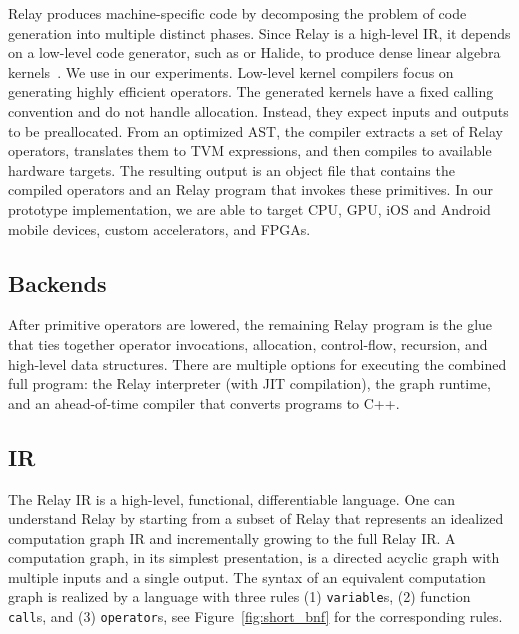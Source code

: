   Relay produces machine-specific code
    by decomposing the problem of code generation into multiple distinct phases.
  Since Relay is a high-level IR, it depends on a low-level code generator,
    such as \tvm or Halide,
    to produce dense linear algebra kernels~\citep{tvm_osdi18, halide}.
  We use \tvm in our experiments.
  Low-level kernel compilers focus on generating highly efficient operators.
  The generated kernels have a fixed calling convention and do not
    handle allocation. Instead, they expect inputs and outputs to be preallocated.
  From an optimized AST,
    the compiler extracts a set of Relay operators,
    translates them to TVM expressions,
    and then compiles to available hardware targets.
  The resulting output is an
    object file that contains the compiled operators
    and an Relay program that invokes these primitives.
  In our prototype implementation,
    we are able to target CPU, GPU,
    iOS and Android mobile devices,
    custom accelerators, and FPGAs.

  \subsection{Backends}
  After primitive operators are lowered,
    the remaining Relay program is the glue that ties
    together operator invocations, allocation, control-flow,
    recursion, and high-level data structures.
  There are multiple options for executing the combined full program:
      the Relay interpreter (with JIT compilation),
      the \tvm graph runtime,
      and an ahead-of-time compiler
      that converts programs to C++.

  \subsection{IR}
  

  The Relay IR is a high-level, functional, differentiable language.
  One can understand Relay by starting from a subset of Relay
    that represents an idealized computation graph IR and
    incrementally growing to the full Relay IR.
  A computation graph, in its simplest presentation, is a directed acyclic
    graph with multiple inputs and a single output.
  The syntax of an equivalent computation graph is realized by
    a language with three rules (1) \verb|variable|s, (2) function \verb|call|s,
    and (3) \verb|operator|s, see Figure~\ref{fig:short_bnf} for the corresponding rules.

